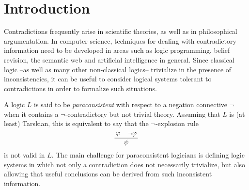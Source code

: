 \documentclass{article}
\theoremstyle{definition}
\begin{document}
\section{Introduction} \label{sect1}

Contradictions frequently arise in scientific theories, as well as in philosophical argumentation. In computer science, techniques for dealing with contradictory information need to be developed in areas such as logic programming, belief revision, the semantic web and artificial intelligence in general. Since classical logic --as well as many other non-classical logics-- trivialize in the presence of inconsistencies, it can be useful to consider logical systems tolerant to  contradictions in order to formalize such situations.

A  logic $L$ is said to be  {\em paraconsistent} with respect to a negation connective $\neg$ when it contains a $\neg$-contradictory but not trivial theory. Assuming that $L$ is (at least) Tarskian, this is equivalent to say that the $\neg$-explosion rule $$\frac{\, \varphi \hspace{4mm} \neg \varphi \,}{\psi}$$ is not valid in $L$. The main challenge for paraconsistent logicians is  defining logic systems in which not only a contradiction does not necessarily trivialize, but also allowing that useful conclusions can be derived from such inconsistent information.
\end{document}
